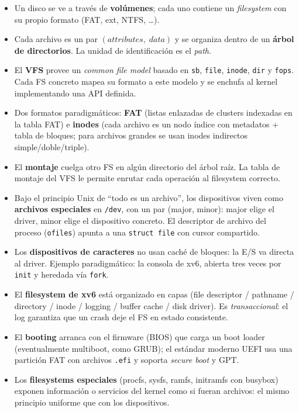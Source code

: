 \documentclass[11pt,a4paper]{article}
\begin{document}
\begin{itemize}[leftmargin=*]
    \item Un disco se ve a través de \textbf{volúmenes}; cada uno
        contiene un \emph{filesystem} con su propio formato (FAT,
        ext, NTFS, \ldots).
    \item Cada archivo es un par
        $(\textit{attributes},\;\textit{data})$ y se organiza dentro
        de un \textbf{árbol de directorios}. La unidad de
        identificación es el \emph{path}.
    \item El \textbf{VFS} provee un \emph{common file model} basado en
        \texttt{sb}, \texttt{file}, \texttt{inode}, \texttt{dir} y
        \texttt{fops}. Cada FS concreto mapea su formato a este
        modelo y se enchufa al kernel implementando una API definida.
    \item Dos formatos paradigmáticos: \textbf{FAT} (listas enlazadas
        de clusters indexadas en la tabla FAT) e \textbf{inodes} (cada
        archivo es un nodo índice con metadatos + tabla de bloques;
        para archivos grandes se usan inodes indirectos
        simple/doble/triple).
    \item El \textbf{montaje} cuelga otro FS en algún directorio del
        árbol raíz. La tabla de montaje del VFS le permite enrutar
        cada operación al filesystem correcto.
    \item Bajo el principio Unix de ``todo es un archivo'', los
        dispositivos viven como \textbf{archivos especiales} en
        \verb|/dev|, con un par (major, minor): major elige el
        driver, minor elige el dispositivo concreto. El descriptor de
        archivo del proceso (\verb|ofiles|) apunta a una
        \texttt{struct file} con cursor compartido.
    \item Los \textbf{dispositivos de caracteres} no usan caché de
        bloques: la E/S va directa al driver. Ejemplo paradigmático:
        la consola de xv6, abierta tres veces por \texttt{init} y
        heredada vía \texttt{fork}.
    \item El \textbf{filesystem de xv6} está organizado en capas
        (file descriptor / pathname / directory / inode / logging /
        buffer cache / disk driver). Es \emph{transaccional}: el log
        garantiza que un crash deje el FS en estado consistente.
    \item El \textbf{booting} arranca con el firmware (BIOS) que carga
        un boot loader (eventualmente multiboot, como GRUB); el
        estándar moderno UEFI usa una partición FAT con archivos
        \texttt{.efi} y soporta \emph{secure boot} y GPT.
    \item Los \textbf{filesystems especiales} (procfs, sysfs, ramfs,
        initramfs con busybox) exponen información o servicios del
        kernel como si fueran archivos: el mismo principio uniforme
        que con los dispositivos.
\end{itemize}
\end{document}
